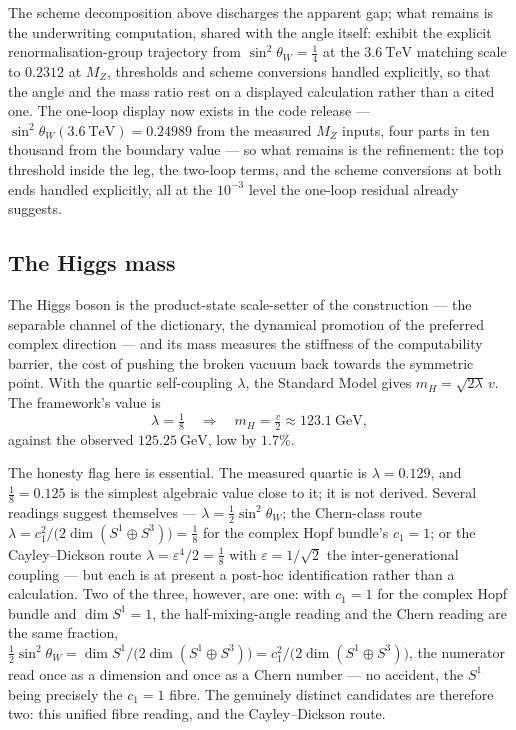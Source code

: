 \begin{openproblem}\label{op:wz-running}
The scheme decomposition above discharges the apparent gap; what remains is the underwriting
computation, shared with the angle itself: exhibit the explicit renormalisation-group trajectory
from $\sin^2\theta_W = \tfrac14$ at the $3.6\ \mathrm{TeV}$ matching scale to $0.2312$ at
$M_Z$, thresholds and scheme conversions handled explicitly, so that the angle and the mass ratio
rest on a displayed calculation rather than a cited one. The one-loop display now exists in the
code release --- $\sin^2\theta_W(3.6\ \mathrm{TeV}) = 0.24989$ from the measured $M_Z$ inputs,
four parts in ten thousand from the boundary value --- so what remains is the refinement: the top
threshold inside the leg, the two-loop terms, and the scheme conversions at both ends handled
explicitly, all at the $10^{-3}$ level the one-loop residual already suggests.
\end{openproblem}

\subsection{The Higgs mass}

The Higgs boson is the product-state scale-setter of the construction --- the separable channel of
the dictionary, the dynamical promotion of the preferred complex direction
\autocite{szangolies2025standardmodel} --- and its mass measures the stiffness of the computability
barrier, the cost of pushing the broken vacuum back towards the symmetric point. With the quartic
self-coupling $\lambda$, the Standard Model gives $m_H = \sqrt{2\lambda}\,v$. The framework's value is
\begin{equation}
  \lambda = \tfrac18 \quad\Longrightarrow\quad m_H = \tfrac{v}{2} \approx 123.1\ \mathrm{GeV},
\end{equation}
against the observed $125.25\ \mathrm{GeV}$, low by $1.7\%$.

The honesty flag here is essential. The measured quartic is $\lambda = 0.129$, and $\tfrac18 = 0.125$
is the simplest algebraic value close to it; it is not derived. Several readings suggest themselves
--- $\lambda = \tfrac12\sin^2\theta_W$; the Chern-class route
$\lambda = c_1^2/\bigl(2\dim(S^1\oplus S^3)\bigr) = \tfrac18$ for the complex Hopf bundle's
$c_1 = 1$; or the Cayley--Dickson route $\lambda = \varepsilon^4/2 = \tfrac18$ with
$\varepsilon = 1/\sqrt2$ the inter-generational coupling --- but each is at present a post-hoc
identification rather than a calculation. Two of the three, however, are one: with $c_1 = 1$ for
the complex Hopf bundle and $\dim S^1 = 1$, the half-mixing-angle reading and the Chern reading
are the same fraction, $\tfrac12\sin^2\theta_W = \dim S^1/\bigl(2\dim(S^1\oplus S^3)\bigr)
= c_1^2/\bigl(2\dim(S^1\oplus S^3)\bigr)$, the numerator read once as a dimension and once as a
Chern number --- no accident, the $S^1$ being precisely the $c_1 = 1$ fibre. The genuinely distinct
candidates are therefore two: this unified fibre reading, and the Cayley--Dickson route.

